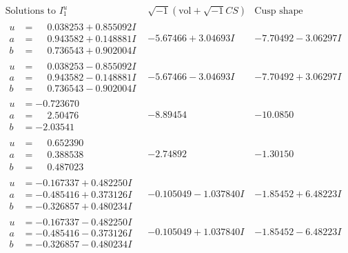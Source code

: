 \documentclass[1p]{elsarticle_modified}
\theoremstyle{definition}
\newcommand{\I}{\sqrt{-1}}
\begin{document}
$$\begin{array}{c|c|c}  
\text{Solutions to }I^u_{1}& \I (\text{vol} + \sqrt{-1}CS) & \text{Cusp shape}\\
 \hline 
\begin{aligned}
u &= \phantom{-}0.038253 + 0.855092 I \\
a &= \phantom{-}0.943582 + 0.148881 I \\
b &= \phantom{-}0.736543 + 0.902004 I\end{aligned}
 & -5.67466 + 3.04693 I & -7.70492 - 3.06297 I \\ \hline\begin{aligned}
u &= \phantom{-}0.038253 - 0.855092 I \\
a &= \phantom{-}0.943582 - 0.148881 I \\
b &= \phantom{-}0.736543 - 0.902004 I\end{aligned}
 & -5.67466 - 3.04693 I & -7.70492 + 3.06297 I \\ \hline\begin{aligned}
u &= -0.723670\phantom{ +0.000000I} \\
a &= \phantom{-}2.50476\phantom{ +0.000000I} \\
b &= -2.03541\phantom{ +0.000000I}\end{aligned}
 & -8.89454\phantom{ +0.000000I} & -10.0850\phantom{ +0.000000I} \\ \hline\begin{aligned}
u &= \phantom{-}0.652390\phantom{ +0.000000I} \\
a &= \phantom{-}0.388538\phantom{ +0.000000I} \\
b &= \phantom{-}0.487023\phantom{ +0.000000I}\end{aligned}
 & -2.74892\phantom{ +0.000000I} & -1.30150\phantom{ +0.000000I} \\ \hline\begin{aligned}
u &= -0.167337 + 0.482250 I \\
a &= -0.485416 + 0.373126 I \\
b &= -0.326857 + 0.480234 I\end{aligned}
 & -0.105049 - 1.037840 I & -1.85452 + 6.48223 I \\ \hline\begin{aligned}
u &= -0.167337 - 0.482250 I \\
a &= -0.485416 - 0.373126 I \\
b &= -0.326857 - 0.480234 I\end{aligned}
 & -0.105049 + 1.037840 I & -1.85452 - 6.48223 I \\ \hline\begin{aligned}

\end{aligned}
\end{array}$$
\end{document}
